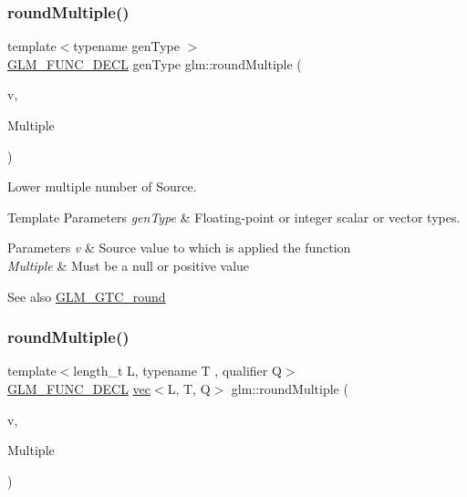 \subsubsection{\texorpdfstring{round\+Multiple()}{roundMultiple()}\hspace{0.1cm}{\footnotesize\ttfamily [1/2]}}
{\footnotesize\ttfamily template$<$typename gen\+Type $>$ \\
\hyperlink{setup_8hpp_ab2d052de21a70539923e9bcbf6e83a51}{G\+L\+M\+\_\+\+F\+U\+N\+C\+\_\+\+D\+E\+CL} gen\+Type glm\+::round\+Multiple (\begin{DoxyParamCaption}\item[{gen\+Type}]{v,  }\item[{gen\+Type}]{Multiple }\end{DoxyParamCaption})}

Lower multiple number of Source.


\begin{DoxyTemplParams}{Template Parameters}
{\em gen\+Type} & Floating-\/point or integer scalar or vector types.\\
\hline
\end{DoxyTemplParams}

\begin{DoxyParams}{Parameters}
{\em v} & Source value to which is applied the function \\
\hline
{\em Multiple} & Must be a null or positive value\\
\hline
\end{DoxyParams}
\begin{DoxySeeAlso}{See also}
\hyperlink{group__gtc__round}{G\+L\+M\+\_\+\+G\+T\+C\+\_\+round} 
\end{DoxySeeAlso}
\mbox{\label{group__gtc__round_ga2f1a68332d761804c054460a612e3a4b}} 
\subsubsection{\texorpdfstring{round\+Multiple()}{roundMultiple()}\hspace{0.1cm}{\footnotesize\ttfamily [2/2]}}
{\footnotesize\ttfamily template$<$length\+\_\+t L, typename T , qualifier Q$>$ \\
\hyperlink{setup_8hpp_ab2d052de21a70539923e9bcbf6e83a51}{G\+L\+M\+\_\+\+F\+U\+N\+C\+\_\+\+D\+E\+CL} \hyperlink{structglm_1_1vec}{vec}$<$L, T, Q$>$ glm\+::round\+Multiple (\begin{DoxyParamCaption}\item[{\hyperlink{structglm_1_1vec}{vec}$<$ L, T, Q $>$ const \&}]{v,  }\item[{\hyperlink{structglm_1_1vec}{vec}$<$ L, T, Q $>$ const \&}]{Multiple }\end{DoxyParamCaption})}

